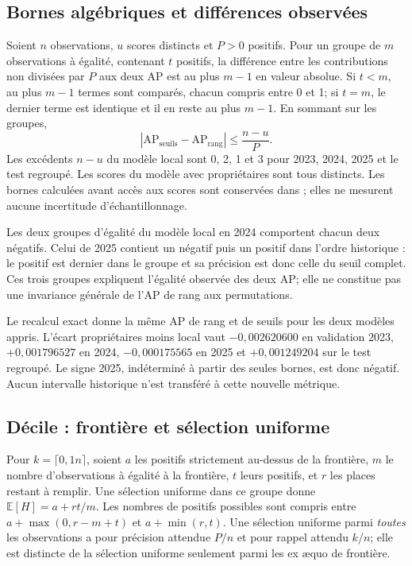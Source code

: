 \subsection{Bornes algébriques et différences observées}
Soient $n$ observations, $u$ scores distincts et $P>0$ positifs. Pour un groupe de $m$ observations à égalité, contenant $t$ positifs, la différence entre les contributions non divisées par $P$ aux deux AP est au plus $m-1$ en valeur absolue. Si $t<m$, au plus $m-1$ termes sont comparés, chacun compris entre 0 et 1; si $t=m$, le dernier terme est identique et il en reste au plus $m-1$. En sommant sur les groupes,
\[
 |\mathrm{AP}_{\mathrm{seuils}}-\mathrm{AP}_{\mathrm{rang}}|\le\frac{n-u}{P}.
\]
Les excédents $n-u$ du modèle local sont 0, 2, 1 et 3 pour 2023, 2024, 2025 et le test regroupé. Les scores du modèle avec propriétaires sont tous distincts. Les bornes calculées avant accès aux scores sont conservées dans ; elles ne mesurent aucune incertitude d'échantillonnage.

Les deux groupes d'égalité du modèle local en 2024 comportent chacun deux négatifs. Celui de 2025 contient un négatif puis un positif dans l'ordre historique : le positif est dernier dans le groupe et sa précision est donc celle du seuil complet. Ces trois groupes expliquent l'égalité observée des deux AP; elle ne constitue pas une invariance générale de l'AP de rang aux permutations.

Le recalcul exact donne la même AP de rang et de seuils pour les deux modèles appris. L'écart propriétaires moins local vaut $-0,002620600$ en validation 2023, $+0,001796527$ en 2024, $-0,000175565$ en 2025 et $+0,001249204$ sur le test regroupé. Le signe 2025, indéterminé à partir des seules bornes, est donc négatif. Aucun intervalle historique n'est transféré à cette nouvelle métrique.

\subsection{Décile : frontière et sélection uniforme}
Pour $k=\lceil0,1n\rceil$, soient $a$ les positifs strictement au-dessus de la frontière, $m$ le nombre d'observations à égalité à la frontière, $t$ leurs positifs, et $r$ les places restant à remplir. Une sélection uniforme dans ce groupe donne $\mathbb{E}[H]=a+rt/m$. Les nombres de positifs possibles sont compris entre $a+\max(0,r-m+t)$ et $a+\min(r,t)$. Une sélection uniforme parmi \emph{toutes} les observations a pour précision attendue $P/n$ et pour rappel attendu $k/n$; elle est distincte de la sélection uniforme seulement parmi les ex æquo de frontière.


